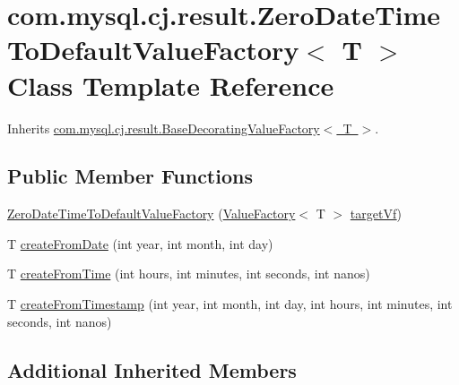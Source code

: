 \hypertarget{classcom_1_1mysql_1_1cj_1_1result_1_1_zero_date_time_to_default_value_factory}{}\section{com.\+mysql.\+cj.\+result.\+Zero\+Date\+Time\+To\+Default\+Value\+Factory$<$ T $>$ Class Template Reference}
\label{classcom_1_1mysql_1_1cj_1_1result_1_1_zero_date_time_to_default_value_factory}


Inherits \mbox{\hyperlink{classcom_1_1mysql_1_1cj_1_1result_1_1_base_decorating_value_factory}{com.\+mysql.\+cj.\+result.\+Base\+Decorating\+Value\+Factory$<$ T $>$}}.

\subsection*{Public Member Functions}
\begin{DoxyCompactItemize}
\item 
\mbox{\hyperlink{classcom_1_1mysql_1_1cj_1_1result_1_1_zero_date_time_to_default_value_factory_a760b32c06c80ba6719cee9aae77066b6}{Zero\+Date\+Time\+To\+Default\+Value\+Factory}} (\mbox{\hyperlink{interfacecom_1_1mysql_1_1cj_1_1result_1_1_value_factory}{Value\+Factory}}$<$ T $>$ \mbox{\hyperlink{classcom_1_1mysql_1_1cj_1_1result_1_1_base_decorating_value_factory_a64c2c62bd9906ec3af7fc62e58bf34b3}{target\+Vf}})
\item 
T \mbox{\hyperlink{classcom_1_1mysql_1_1cj_1_1result_1_1_zero_date_time_to_default_value_factory_ae629c81471dfdf02f153bb84afcba93e}{create\+From\+Date}} (int year, int month, int day)
\item 
T \mbox{\hyperlink{classcom_1_1mysql_1_1cj_1_1result_1_1_zero_date_time_to_default_value_factory_a97adb0b51c3cf9d2bd908ea650f25f2d}{create\+From\+Time}} (int hours, int minutes, int seconds, int nanos)
\item 
T \mbox{\hyperlink{classcom_1_1mysql_1_1cj_1_1result_1_1_zero_date_time_to_default_value_factory_a5b0935e9804d9f90a3fd09ce5bb78fc8}{create\+From\+Timestamp}} (int year, int month, int day, int hours, int minutes, int seconds, int nanos)
\end{DoxyCompactItemize}
\subsection*{Additional Inherited Members}


